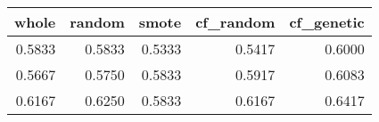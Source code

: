 \begin{tabular}{rrrrr}
\toprule

 whole &  random &  smote &  cf\_random &  cf\_genetic \\
\midrule

0.5833 &  0.5833 & 0.5333 &     0.5417 &      0.6000 \\
0.5667 &  0.5750 & 0.5833 &     0.5917 &      0.6083 \\
0.6167 &  0.6250 & 0.5833 &     0.6167 &      0.6417 \\

\bottomrule
\end{tabular}
